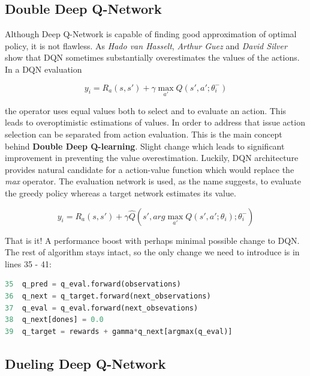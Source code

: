 \subsection{Double Deep Q-Network}
\label{sub:double-deep-q-network}

Although Deep Q-Network is capable of finding good approximation of optimal policy, it is not flawless. As \emph{Hado van Hasselt}, \emph{Arthur Guez} and \emph{David Silver} \cite{DBLP:journals/corr/HasseltGS15} show that DQN sometimes substantially overestimates the values of the actions. In a DQN evaluation

\begin{equation}
    y_i = R_a(s, s') + \gamma \max_{a'}Q(s', a'; \theta^-_i)
\end{equation}

the  operator uses equal values both to select and to evaluate an action. This leads to overoptimistic estimations of values. In order to address that issue action selection can be separated from action evaluation. This is the main concept behind \textbf{Double Deep Q-learning}. Slight change which leads to significant improvement in preventing the value overestimation. Luckily, DQN architecture provides natural candidate for a action-value function which would replace the \emph{max} operator. The evaluation network is used, as the name suggests, to evaluate the greedy policy whereas a target network estimates its value.

\begin{equation}
    y_i = R_a(s, s') + \gamma \hat{Q}(s', arg\max_{a'}Q(s', a'; \theta_i); \theta^-_i)
\end{equation}

That is it! A performance boost with perhaps minimal possible change to DQN. The rest of algorithm stays intact, so the only change we need to introduce is in lines 35 - 41:

\begin{lstlisting}[language=Python, caption={Double Deep Q-learning modification}]
35  q_pred = q_eval.forward(observations)
36  q_next = q_target.forward(next_observations)
37  q_eval = q_eval.forward(next_obsevations)
38  q_next[dones] = 0.0
39  q_target = rewards + gamma*q_next[argmax(q_eval)]
\end{lstlisting}

\subsection{Dueling Deep Q-Network}
\label{sub:dueling-deep-q-network}


